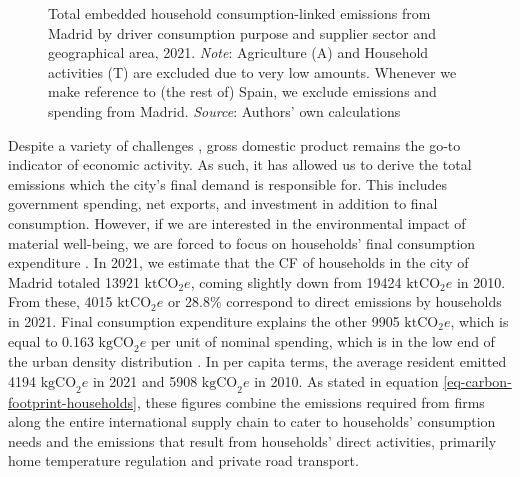 \documentclass[
  10pt,
  twocolumn]{aft}
\begin{document}
\begin{figure}


\caption{\label{fig-cf-consumption-source}Total embedded household
consumption-linked emissions from Madrid by driver consumption purpose
and supplier sector and geographical area, 2021. \emph{Note}:
Agriculture (A) and Household activities (T) are excluded due to very
low amounts. Whenever we make reference to (the rest of) Spain, we
exclude emissions and spending from Madrid. \emph{Source}: Authors' own
calculations}

\end{figure}%

Despite a variety of challenges
\citep{macekuraMismeasureProgressEconomic2020, stiglitz_report_2009},
gross domestic product remains the go-to indicator of economic activity.
As such, it has allowed us to derive the total emissions which the
city's final demand is responsible for. This includes government
spending, net exports, and investment in addition to final consumption.
However, if we are interested in the environmental impact of material
well-being, we are forced to focus on households' final consumption
expenditure \citep{sala_consumption_2019}. In 2021, we estimate that the
CF of households in the city of Madrid totaled 13921 \(\text{ktCO}_2e\),
coming slightly down from 19424 \(\text{ktCO}_2e\) in 2010. From these,
4015 \(\text{ktCO}_2e\) or 28.8\% correspond to direct emissions by
households in 2021. Final consumption expenditure explains the other
9905 \(\text{ktCO}_2e\), which is equal to 0.163 \(\text{kgCO}_2e\) per
unit of nominal spending, which is in the low end of the urban density
distribution \citep{corcoles_carbon_2024, ivanova_mapping_2017}. In per
capita terms, the average resident emitted 4194 \(\text{kgCO}_2e\) in
2021 and 5908 \(\text{kgCO}_2e\) in 2010. As stated in equation
\ref{eq-carbon-footprint-households}, these figures combine the
emissions required from firms along the entire international supply
chain to cater to households' consumption needs and the emissions that
result from households' direct activities, primarily home temperature
regulation and private road transport.
\end{document}
